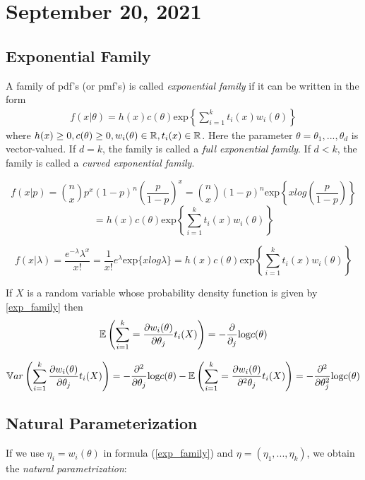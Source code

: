 \section{September 20, 2021}
\subsection{Exponential Family}
A family of pdf's (or pmf's) is called \textit{exponential family} if it can be written in the form
\begin{align}\label{exp_family}
    f(x|\theta) = h(x)c(\theta)\text{exp} \left \{ \sum_{i=1}^kt_i(x)w_i(\theta)\right \}
\end{align}
where $h(x) \geq 0, c(\theta) \geq 0, w_i(\theta) \in \mathbb R, t_i(x) \in \mathbb R$. Here the parameter $\theta = {\theta_1,...,\theta_d}$ is vector-valued. If $d=k$, the family is called a \textit{full exponential family}. If $d < k$, the family is called a \textit{curved exponential family}. 

\begin{example}
    $$f(x|p) = {n \choose x} p^{x}(1-p)^{n} \left ( \frac{p}{1-p}\right )^x = 
    {n \choose x} (1-p)^{n}\text{exp} \left \{ xlog \left( \frac{p}{1-p}\right) \right \}$$
    $$
    =h(x)c(\theta)\text{exp} \left \{ \sum_{i=1}^kt_i(x)w_i(\theta)\right \}
    $$
\end{example}
\begin{example}
    $$
    f(x|\lambda) = \frac{e^{-\lambda}\lambda^{x}}{x!}
    =\frac{1}{x!}e^{\lambda}\text{exp}\{xlog\lambda\} =
    h(x)c(\theta)\text{exp} \left \{ \sum_{i=1}^kt_i(x)w_i(\theta)\right \}
    $$
\end{example}

\begin{theorem}
If $X$ is a random variable whose probability density function is given by \ref{exp_family} then
$$
\mathbb E \left (
\sum_{i=1}^{k} = \frac{\partial w_i(\theta)}{\partial\theta_j}t_i(X)\right)
= -\frac{\partial}{\partial_j} \text{log} c(\theta)
$$

$$
\mathbb V ar \left (
\sum_{i=1}^{k}  \frac{\partial w_i(\theta)}{\partial\theta_j}t_i(X)\right)
= -\frac{\partial^2}{\partial \theta_j} \text{log} c(\theta) 
- \mathbb E \left (
\sum_{i=1}^{k} = \frac{\partial w_i(\theta)}{\partial^2 \theta_j}t_i(X)\right)
= -\frac{\partial^2}{\partial \theta_j^2} \text{log} c(\theta)$$
\end{theorem}
\subsection{Natural Parameterization}
If we use $\eta_i = w_i(\theta)$ in formula (\ref{exp_family}) and $\eta =(\eta_1,...,\eta_k)$, we obtain the \textit{natural parametrization}:

